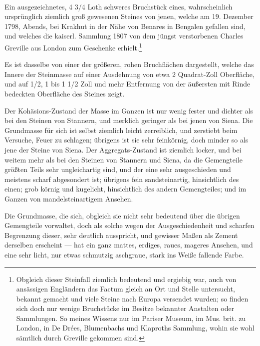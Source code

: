 \documentclass[a4paper, 11pt, oneside, german]{article}
\begin{document}
\paragraph{}
Ein ausgezeichnetes, 4 3/4 Loth schweres Bruchstück eines, wahrscheinlich ursprünglich ziemlich groß gewesenen Steines von jenen, welche am 19. Dezember 1798, Abends, bei Krakhut in der Nähe von Benares in Bengalen gefallen sind, und welches die kaiserl. Sammlung 1807 von dem jüngst verstorbenen Charles Greville aus London zum Geschenke erhielt.\footnote{Obgleich dieser Steinfall ziemlich bedeutend und ergiebig war, auch von ansässigen Engländern das Factum gleich an Ort und Stelle untersucht, bekannt gemacht und viele Steine nach Europa versendet wurden; so finden sich doch nur wenige Bruchstücke im Besitze bekannter Anstalten oder Sammlungen. So meines Wissens nur im Pariser Museum, im Mus. brit. zu London, in De Drées, Blumenbachs und Klaproths Sammlung, wohin sie wohl sämtlich durch Greville gekommen sind.}

Es ist dasselbe von einer der größeren, rohen Bruchflächen dargestellt, welche das Innere der Steinmasse auf einer Ausdehnung von etwa 2 Quadrat-Zoll Oberfläche, und auf 1/2, 1 bis 1 1/2 Zoll und mehr Entfernung von der äußersten mit Rinde bedeckten Oberfläche des Steines zeigt.

Der Kohäsions-Zustand der Masse im Ganzen ist nur wenig fester und dichter als bei den Steinen von Stannern, und merklich geringer als bei jenen von Siena. Die Grundmasse für sich ist selbst ziemlich leicht zerreiblich, und zerstiebt beim Versuche, Feuer zu schlagen; übrigens ist sie sehr feinkörnig, doch minder so als jene der Steine von Siena. Der Aggregats-Zustand ist ziemlich locker, und bei weitem mehr als bei den Steinen von Stannern und Siena, da die Gemengteile größten Teils sehr ungleichartig sind, und der eine sehr ausgeschieden und meistens scharf abgesondert ist; übrigens fein sandsteinartig, hinsichtlich des einen; grob körnig und kugelicht, hinsichtlich des andern Gemengteiles; und im Ganzen von mandelsteinartigem Ansehen.

Die Grundmasse, die sich, obgleich sie nicht sehr bedeutend über die übrigen Gemengteile vorwaltet, doch als solche wegen der Ausgeschiedenheit und scharfen Begrenzung dieser, sehr deutlich ausspricht, und gewisser Maßen als Zement derselben erscheint --- hat ein ganz mattes, erdiges, raues, mageres Ansehen, und eine sehr licht, nur etwas schmutzig aschgraue, stark ins Weiße fallende Farbe.
\end{document}
